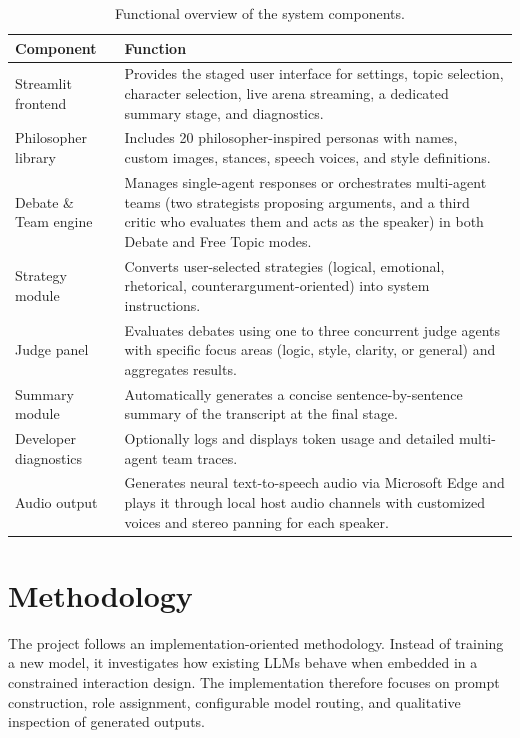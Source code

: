 \documentclass[11pt,a4paper]{article}
\begin{document}
\begin{table}[H]
\centering
\begin{tabular}{>{\raggedright\arraybackslash}p{4cm} >{\raggedright\arraybackslash}p{10cm}}
\toprule
\textbf{Component} & \textbf{Function} \\
\midrule
Streamlit frontend & Provides the staged user interface for settings, topic selection, character selection, live arena streaming, a dedicated summary stage, and diagnostics. \\
Philosopher library & Includes 20 philosopher-inspired personas with names, custom images, stances, speech voices, and style definitions. \\
Debate \& Team engine & Manages single-agent responses or orchestrates multi-agent teams (two strategists proposing arguments, and a third critic who evaluates them and acts as the speaker) in both Debate and Free Topic modes. \\
Strategy module & Converts user-selected strategies (logical, emotional, rhetorical, counterargument-oriented) into system instructions. \\
Judge panel & Evaluates debates using one to three concurrent judge agents with specific focus areas (logic, style, clarity, or general) and aggregates results. \\
Summary module & Automatically generates a concise sentence-by-sentence summary of the transcript at the final stage. \\
Developer diagnostics & Optionally logs and displays token usage and detailed multi-agent team traces. \\
Audio output & Generates neural text-to-speech audio via Microsoft Edge and plays it through local host audio channels with customized voices and stereo panning for each speaker. \\
\bottomrule
\end{tabular}
\caption{Functional overview of the system components.}
\label{tab:components}
\end{table}

\section{Methodology}

The project follows an implementation-oriented methodology. Instead of training a new model, it investigates how existing LLMs behave when embedded in a constrained interaction design. The implementation therefore focuses on prompt construction, role assignment, configurable model routing, and qualitative inspection of generated outputs.
\end{document}
